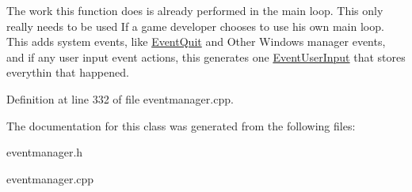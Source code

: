 The work this function does is already performed in the main loop. This only really needs to be used If a game developer chooses to use his own main loop. This adds system events, like \hyperlink{classMezzanine_1_1EventQuit}{EventQuit} and Other Windows manager events, and if any user input event actions, this generates one \hyperlink{classMezzanine_1_1EventUserInput}{EventUserInput} that stores everythin that happened. 

Definition at line 332 of file eventmanager.cpp.



The documentation for this class was generated from the following files:\begin{DoxyCompactItemize}
\item 
eventmanager.h\item 
eventmanager.cpp\end{DoxyCompactItemize}
